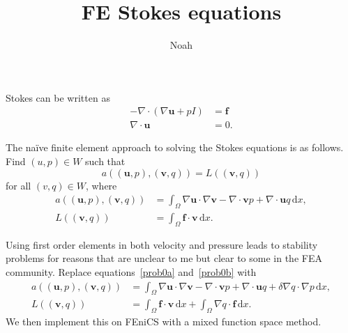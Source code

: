 \documentclass[]{article}
\newcommand{\dif}{\mathrm{d}}
\newcommand{\dvr}{\nabla \cdot}
\newcommand{\grad}{\nabla}
\newcommand{\eq}{\begin{equation}}
\newcommand{\qe}{\end{equation}}
\begin{document}
\title{FE Stokes equations}
\author{Noah}
\maketitle

Stokes can be written as 
\begin{align}
- \dvr (\grad \mathbf{u} + p I) &= \mathbf{f} \\
\dvr \mathbf{u} &= 0.
\end{align}

The na\"ive finite element approach to solving the Stokes equations is as follows. 
Find $(u,p) \in W$ such that
\eq
a((\mathbf{u}, p), (\mathbf{v}, q)) = L((\mathbf{v},q))
\qe
for all $(v, q) \in W$, where
\begin{align}\label{prob0a}
a ((\mathbf{u},p), (\mathbf{v},q)) &= \int_\Omega \grad \mathbf{u} \cdot \grad \mathbf{v} - \grad \cdot \mathbf{v} p + \grad \cdot \mathbf{u} q \, \dif x,
\\ 
\label{prob0b}
L((\mathbf{v},q)) &= \int_\Omega \mathbf{f} \cdot \mathbf{v} \, \dif x.
\end{align}

Using first order elements in both velocity and pressure leads to stability problems for reasons that are unclear to me but clear to some in the FEA community.
Replace equations~\ref{prob0a} and~\ref{prob0b} with 
\begin{align}
a ((\mathbf{u}, p), (\mathbf{v},q)) &= \int_\Omega \grad \mathbf{u} \cdot \grad \mathbf{v} - \grad \cdot \mathbf{v} p + \grad \cdot \mathbf{u} q  + \delta \grad q \cdot \grad p \, \dif x,
\\
L((\mathbf{v},q)) &= \int_\Omega \mathbf{f} \cdot \mathbf{v} \, \dif x 
+ \int_\Omega \grad q \cdot \mathbf{f} \, \dif x.
\end{align}
We then implement this on FEniCS with a mixed function space method.
\end{document}
